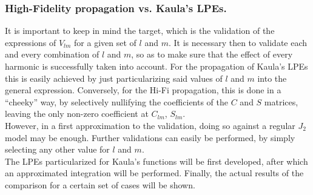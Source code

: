 			\subsubsection{High-Fidelity propagation vs. Kaula's LPEs.}
			\indent It is important to keep in mind the target, which is the validation of the expressions of $V_{lm}$ for a given set of $l$ and $m$. It is necessary then to validate each and every combination of $l$ and $m$, so as to make sure that the effect of every harmonic is successfully taken into account. For the propagation of Kaula's LPEs this is easily achieved by just particularizing said values of $l$ and $m$ into the general expression. Conversely, for the Hi-Fi propagation, this is done in a ``cheeky'' way, by selectively nullifying the coefficients of the $C$ and $S$ matrices, leaving the only non-zero coefficient at $C_{lm}$, $S_{lm}$.\\
			\indent However, in a first approximation to the validation, doing so against a regular $J_2$ model may be enough. Further validations can easily be performed, by simply selecting any other value for $l$ and $m$.\\
			\indent The LPEs particularized for Kaula's functions will be first developed, after which an approximated integration will be performed. Finally, the actual results of the comparison for a certain set of cases will be shown.
